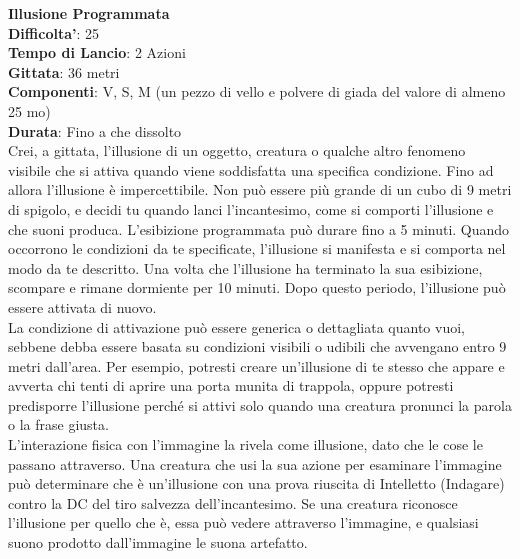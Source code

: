 \begin{multicols}{2}
\medskip\textbf{Illusione Programmata}\\
\textbf{Difficolta'}: 25\\
\textbf{Tempo di Lancio}: 2 Azioni\\
\textbf{Gittata}: 36 metri\\
\textbf{Componenti}: V, S, M (un pezzo di vello e polvere di giada del valore di almeno 25 mo)\\
\textbf{Durata}: Fino a che dissolto\\
Crei, a gittata, l’illusione di un oggetto, creatura o qualche altro fenomeno visibile che si attiva quando viene soddisfatta una specifica condizione. Fino ad allora l’illusione è impercettibile. Non può essere più grande di un cubo di 9 metri di spigolo, e decidi tu quando lanci l’incantesimo, come si comporti l’illusione e che suoni produca. L’esibizione programmata può durare fino a 5 minuti. Quando occorrono le condizioni da te specificate, l’illusione si manifesta e si comporta nel modo da te descritto. Una volta che l’illusione ha terminato la sua esibizione, scompare e rimane dormiente per 10 minuti. Dopo questo periodo, l’illusione può essere attivata di nuovo.\\
La condizione di attivazione può essere generica o dettagliata quanto vuoi, sebbene debba essere basata su condizioni visibili o udibili che avvengano entro 9 metri dall’area. Per esempio, potresti creare un’illusione di te stesso che appare e avverta chi tenti di aprire una porta munita di trappola, oppure potresti predisporre l’illusione perché si attivi solo quando una creatura pronunci la parola o la frase giusta.\\
L’interazione fisica con l’immagine la rivela come illusione, dato che le cose le passano attraverso. Una creatura che usi la sua azione per esaminare l’immagine può determinare che è un’illusione con una prova riuscita di Intelletto (Indagare) contro la DC del tiro salvezza dell’incantesimo. Se una creatura riconosce l’illusione per quello che è, essa può vedere attraverso l’immagine, e qualsiasi suono prodotto dall’immagine le suona artefatto.


\end{multicols}
